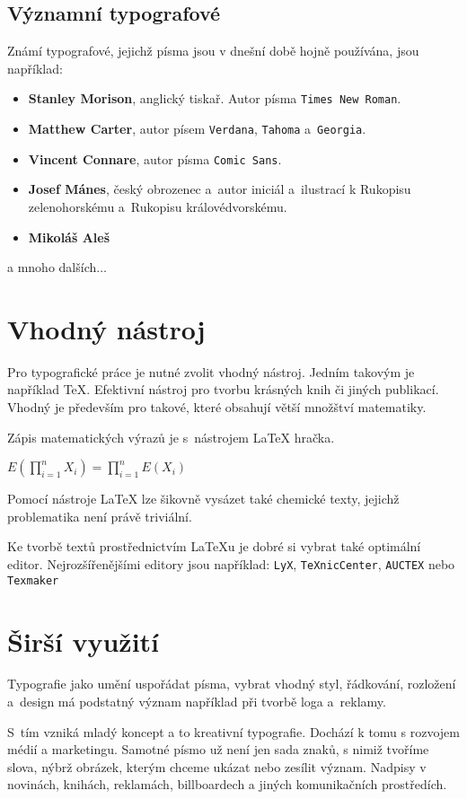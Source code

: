 \documentclass[11pt, a4paper]{article}
\begin{document}
\subsection{Významní typografové}
Známí typografové, jejichž písma jsou v dnešní době hojně používána, jsou například:
\begin{itemize}
\item \textbf{Stanley Morison}, anglický tiskař. Autor písma \texttt{Times New Roman}.
\item \textbf{Matthew Carter}, autor písem \texttt{Verdana}, \texttt{Tahoma} a~\texttt{Georgia}.
\item \textbf{Vincent Connare}, autor písma \texttt{Comic Sans}.
\item \textbf{Josef Mánes}, český obrozenec a~autor iniciál a~ilustrací k Rukopisu zelenohorskému a~Rukopisu královédvorskému.
\item \textbf{Mikoláš Aleš}
\end{itemize}
a mnoho dalších$\dots$
\cite{Wiki}

\section{Vhodný nástroj}
Pro typografické práce je nutné zvolit vhodný nástroj. Jedním takovým je například \TeX. Efektivní nástroj pro tvorbu krásných knih či jiných publikací. Vhodný je především pro takové, které obsahují větší množštví matematiky. \cite{TexBook}

Zápis matematických výrazů je s~nástrojem {\LaTeX} hračka.
\begin{center}
$E(\prod_{i=1}^{n}X_i) = \prod_{i=1}^{n}E(X_i)$ \cite{dipl2}
\end{center}

Pomocí nástroje {\LaTeX} lze šikovně vysázet také chemické texty, jejichž problematika není právě triviální.~\cite{cstug}

Ke tvorbě textů prostřednictvím {\LaTeX}u je dobré si vybrat také optimální editor. Nejrozšířenějšími editory jsou například: \texttt{LyX}, \texttt{TeXnicCenter}, \texttt{AUCTEX} nebo
\texttt{Texmaker} \cite{dipl1}


\section{Širší využití}
Typografie jako umění uspořádat písma, vybrat vhodný styl, řádkování, rozložení a~design má podstatný význam například při tvorbě loga a~reklamy. \cite{typoOnLogo}

S~tím vzniká mladý koncept a to kreativní typografie. Dochází k tomu s rozvojem médií a marketingu. Samotné písmo už není jen sada znaků, s nimiž tvoříme slova, nýbrž obrázek, kterým chceme ukázat nebo zesílit význam. Nadpisy v novinách, knihách, reklamách, billboardech a jiných komunikačních prostředích. \cite{basisTypo}

\newpage
\renewcommand{\refname}{Literatura}


\end{document}
